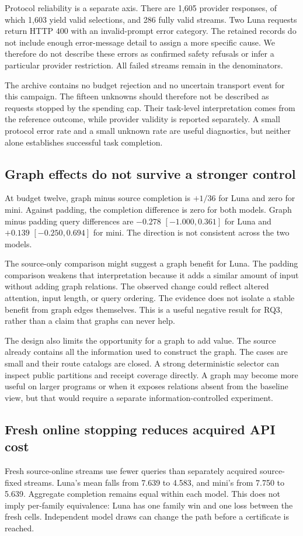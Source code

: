 \documentclass[conference]{IEEEtran}
\begin{document}
Protocol reliability is a separate axis. There are 1,605 provider responses, of which 1,603 yield valid selections, and 286 fully valid streams. Two Luna requests return HTTP 400 with an invalid-prompt error category. The retained records do not include enough error-message detail to assign a more specific cause. We therefore do not describe these errors as confirmed safety refusals or infer a particular provider restriction. All failed streams remain in the denominators.

The archive contains no budget rejection and no uncertain transport event for this campaign. The fifteen unknowns should therefore not be described as requests stopped by the spending cap. Their task-level interpretation comes from the reference outcome, while provider validity is reported separately. A small protocol error rate and a small unknown rate are useful diagnostics, but neither alone establishes successful task completion.

\subsection{Graph effects do not survive a stronger control}
At budget twelve, graph minus source completion is $+1/36$ for Luna and zero for mini. Against padding, the completion difference is zero for both models. Graph minus padding query differences are $-0.278$ $[-1.000,0.361]$ for Luna and $+0.139$ $[-0.250,0.694]$ for mini. The direction is not consistent across the two models.

The source-only comparison might suggest a graph benefit for Luna. The padding comparison weakens that interpretation because it adds a similar amount of input without adding graph relations. The observed change could reflect altered attention, input length, or query ordering. The evidence does not isolate a stable benefit from graph edges themselves. This is a useful negative result for RQ3, rather than a claim that graphs can never help.

The design also limits the opportunity for a graph to add value. The source already contains all the information used to construct the graph. The cases are small and their route catalogs are closed. A strong deterministic selector can inspect public partitions and receipt coverage directly. A graph may become more useful on larger programs or when it exposes relations absent from the baseline view, but that would require a separate information-controlled experiment.

\subsection{Fresh online stopping reduces acquired API cost}
Fresh source-online streams use fewer queries than separately acquired source-fixed streams. Luna's mean falls from 7.639 to 4.583, and mini's from 7.750 to 5.639. Aggregate completion remains equal within each model. This does not imply per-family equivalence: Luna has one family win and one loss between the fresh cells. Independent model draws can change the path before a certificate is reached.
\end{document}
